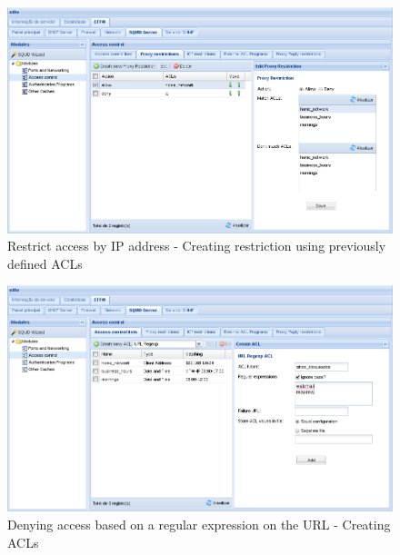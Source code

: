 \begin{figure}[H]
    \begin{center}
    \includegraphics[scale=0.38]{screenshots/etfw/etfw_squid_example_acessoip_02.png}
    \caption{Restrict access by IP address - Creating restriction using previously defined ACLs}
    \label{fig:etfw_squid_example_acessoip_02}
    \end{center}
\end{figure}

\begin{figure}[H]
    \begin{center}
    \includegraphics[scale=0.38]{screenshots/etfw/etfw_squid_example_urlregexp_01.png}
    \caption{Denying access based on a regular expression on the URL - Creating ACLs}
    \label{fig:etfw_squid_example_urlregexp_01}
    \end{center}
\end{figure}

